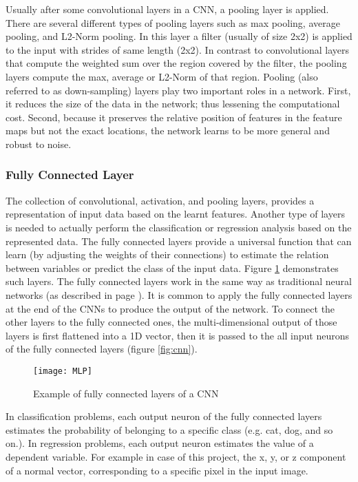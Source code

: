 Usually after some convolutional layers in a CNN, a pooling layer is applied. There are several different types of pooling layers such as max pooling, average pooling, and L2-Norm pooling. In this layer a filter (usually of size 2x2) is applied to the input with strides of same length (2x2). In contrast to convolutional layers that compute the weighted sum over the region covered by the filter, the pooling layers compute the max, average or L2-Norm of that region. Pooling (also referred to as down-sampling) layers play two important roles in a network. First, it reduces the size of the data in the network; thus lessening the computational cost. Second, because it preserves the relative position of features in the feature maps but not the exact locations, the network learns to be more general and robust to noise. 

\subsubsection{Fully Connected Layer}

The collection of convolutional, activation, and pooling layers, provides a representation of input data based on the learnt features. Another type of layers is needed to actually perform the classification or regression analysis based on the represented data. The fully connected layers provide a universal function that can learn (by adjusting the weights of their connections) to estimate the relation between variables or predict the class of the input data. Figure \ref{fig:MLP} demonstrates such layers. The fully connected layers work in the same way as traditional neural networks (as described in page \pageref{sec:bgoverview}). It is common to apply the fully connected layers at the end of the CNNs to produce the output of the network. To connect the other layers to the fully connected ones, the multi-dimensional output of those layers is first flattened into a 1D vector, then it is passed to the all input neurons of the fully connected layers (figure \ref{fig:cnn}). 

\begin{figure}
    \centering
    \texttt{[image: MLP]}
    \caption{Example of fully connected layers of a CNN }
    \label{fig:MLP}
\end{figure}

In classification problems, each output neuron of the fully connected layers estimates the probability of belonging to a specific class (e.g. cat, dog, and so on.). In regression problems, each output neuron estimates the value of a dependent variable. For example in case of this project, the x, y, or z component of a normal vector, corresponding to a specific pixel in the input image. 

